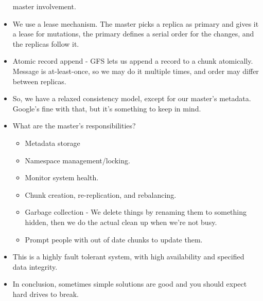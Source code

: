 \documentclass{scrartcl}
\begin{document}
\begin{itemize}
	master involvement.
\item We use a lease mechanism. The master picks a replica as primary and
	gives it a lease for mutations, the primary defines a serial order for the
	changes, and the replicas follow it.
\item Atomic record append - GFS lets us append a record to a chunk atomically.
	Message is at-least-once, so we may do it multiple times, and order may
	differ between replicas.
\item So, we have a relaxed consistency model, except for our master's metadata.
	Google's fine with that, but it's something to keep in mind.
\item What are the master's responsibilities?
	\begin{itemize}
	\item Metadata storage
	\item Namespace management/locking.
	\item Monitor system health.
	\item Chunk creation, re-replication, and rebalancing.
	\item Garbage collection - We delete things by renaming them to something
		hidden, then we do the actual clean up when we're not busy.
	\item Prompt people with out of date chunks to update them.
	\end{itemize}
\item This is a highly fault tolerant system, with high availability and
	specified data integrity.
\item In conclusion, sometimes simple solutions are good and you should
	expect hard drives to break.
\end{itemize}
\end{document}
